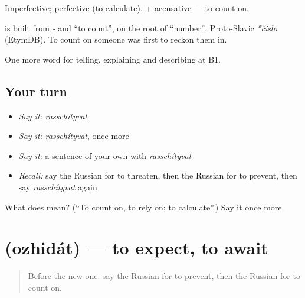 Imperfective; perfective \emph{} (to calculate). \emph{ } + accusative — to count on.

\begin{cousinweb}
\textbf{} is built from \emph{-} and \emph{} \textquotedblleft{}to count\textquotedblright{}, on the root of \emph{} \textquotedblleft{}number\textquotedblright{}, Proto-Slavic \emph{*čislo} (EtymDB). To count on someone was first to reckon them in.
\end{cousinweb}

\begin{grammarlens}[title={What you've built}]
One more word for telling, explaining and describing at B1.
\end{grammarlens}

\subsection*{Your turn}
\begin{itemize}
\raggedright
  \item \emph{Say it:} \emph{rasschítyvat}
  \item \emph{Say it:} \emph{rasschítyvat}, once more
  \item \emph{Say it:} a sentence of your own with \emph{rasschítyvat}
  \item \emph{Recall:} say the Russian for to threaten, then the Russian for to prevent, then say \emph{rasschítyvat} again
\end{itemize}

\begin{tcolorbox}[breakable,colback=teal!4,colframe=teal!35!black,title={Before you move on}]
What does  mean? (\textquotedblleft{}To count on, to rely on; to calculate\textquotedblright{}.) Say it once more.
\end{tcolorbox}
\section[\texorpdfstring{\ru{ожидать} (ozhidát)}{ожидать (ozhidát)}]{ (ozhidát) — to expect, to await}

\label{lesson:RU-C374-ozhidat}



\begin{quote}
Before the new one: say the Russian for to prevent, then the Russian for to count on.
\end{quote}

